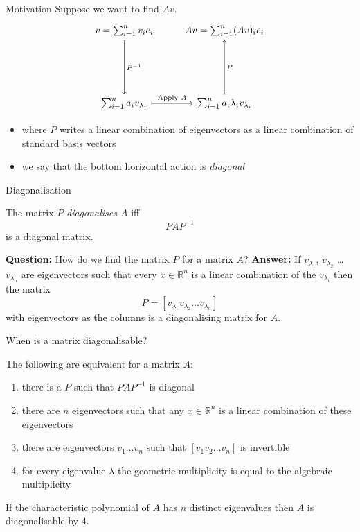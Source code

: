 \documentclass{beamer}
\begin{document}
\begin{frame}[fragile]{Motivation}
Suppose we want to find $Av$.
{\LARGE
\begin{equation*}
\begin{tikzcd}[row sep = 2cm]
v = \sum_{i=1}^n v_i e_i \dar[mapsto]{P^{-1}} & Av = \sum_{i=1}^n (Av)_i e_i\\
\sum_{i=1}^n a_i v_{\lambda_i} \rar[mapsto]{\text{Apply }A} & \sum_{i=1}^n a_i\lambda_i v_{\lambda_i} \uar[mapsto][swap]{P}
\end{tikzcd}
\end{equation*}
}
\begin{itemize}
	\item where $P$ writes a linear combination of eigenvectors as a linear combination of standard basis vectors
	\item we say that the bottom horizontal action is \emph{diagonal}
\end{itemize}
\end{frame}

\begin{frame}{Diagonalisation}
\begin{definition}
The matrix $P$ \emph{diagonalises $A$} iff 
\begin{equation*}
PAP^{-1}
\end{equation*}
is a diagonal matrix.
\end{definition}\vfill
{\bf Question:} How do we find the matrix $P$ for a matrix $A$?\vfill
{\bf Answer:} If $v_{\lambda_1}$, $v_{\lambda_2}$ \dots $v_{\lambda_n}$ are eigenvectors such that every $x\in \mathbb{R}^n$ is a linear combination of the $v_{\lambda_i}$ then the matrix
\begin{equation*}
P = \left[ v_{\lambda_1} v_{\lambda_2} \dots v_{\lambda_n}\right]
\end{equation*}
with eigenvectors as the columns is a diagonalising matrix for $A$.
\end{frame}

\begin{frame}{When is a matrix diagonalisable?}
\begin{theorem}
The following are equivalent for a matrix $A$:
\begin{enumerate}
	\item there is a $P$ such that $PAP^{-1}$ is diagonal
	\item there are $n$ eigenvectors such that any $x\in \mathbb{R}^n$ is a linear combination of these eigenvectors
	\item there are eigenvectors $v_1\dots v_n$ such that $\left[v_1 v_2\dots v_n \right]$ is invertible
	\item for every eigenvalue $\lambda$ the geometric multiplicity is equal to the algebraic multiplicity
\end{enumerate}
\end{theorem}

\begin{lemma}
If the characteristic polynomial of $A$ has $n$ distinct eigenvalues then $A$ is diagonalisable by $4$.
\end{lemma}
\end{frame}
\end{document}
